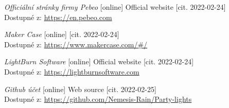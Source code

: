 \begin{thebibliography}{99}
\textit{Officiální stránky firmy Pebeo} [online] Official website [cit. 2022-02-24] \\
Dostupné z: \url{https://en.pebeo.com} 

\textit{Maker Case} [online] [cit. 2022-02-24] \\
Dostupné z: \url{https://www.makercase.com/#/}

\textit{LightBurn Software} [online] Official website [cit. 2022-02-24] \\
Dostupné z: \url{https://lightburnsoftware.com} 

\textit{Github účet} [online] Web source [cit. 2022-02-25] \\
Dostupné z: \url{https://github.com/Nemesis-Rain/Party-lights} 


\end{thebibliography}
